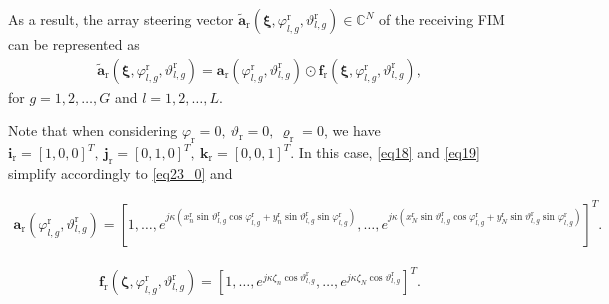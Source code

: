 \documentclass[lettersize,journal]{IEEEtran}
\begin{document}
As a result, the array steering vector $\tilde{\mathbf{a}}_{\textrm{r}}\left ( \boldsymbol{\xi}, \varphi_{l,g}^{\textrm{r}}, \vartheta_{l,g}^{\textrm{r}} \right )\in \mathbb{C}^{N}$ of the receiving FIM can be represented as
\begin{align}\label{eq20}
\tilde{\mathbf{a}}_{\textrm{r}}\left ( \boldsymbol{\xi}, \varphi_{l,g}^{\textrm{r}}, \vartheta_{l,g}^{\textrm{r}} \right )=\mathbf{a}_{\textrm{r}}\left ( \varphi_{l,g}^{\textrm{r}}, \vartheta_{l,g}^{\textrm{r}} \right )\odot\mathbf{f}_{\textrm{r}}\left ( \boldsymbol{\xi}, \varphi_{l,g}^{\textrm{r}}, \vartheta_{l,g}^{\textrm{r}} \right ),
\end{align}
for $g=1,2,\ldots,G$ and $l=1,2,\ldots,L$.

Note that when considering $\varphi _{\textrm{r}}=0,\ \vartheta _{\textrm{r}}=0,\ \varrho _{\textrm{r}}=0$, we have $\mathbf{i}_{\textrm{r}}=\left [ 1,0,0 \right ]^{T},\ \mathbf{j}_{\textrm{r}}=\left [ 0,1,0 \right ]^{T},\ \mathbf{k}_{\textrm{r}}=\left [ 0,0,1 \right ]^{T}$. In this case, \eqref{eq18} and \eqref{eq19} simplify accordingly to \eqref{eq23_0} and
\begin{figure*}[!t]
\begin{align}\label{eq23_0}
 \mathbf{a}_{\textrm{r}}\left ( \varphi_{l,g}^{\textrm{r}}, \vartheta_{l,g}^{\textrm{r}} \right )=\left [ 1,\ldots , e^{j\kappa \left ( x_{n}^{\textrm{r}}\sin\vartheta_{l,g}^{\textrm{r}} \cos\varphi_{l,g}^{\textrm{r}}+y_{n}^{\textrm{r}}\sin\vartheta_{l,g}^{\textrm{r}} \sin\varphi_{l,g}^{\textrm{r}} \right )}, \ldots ,e^{j\kappa \left ( x_{N}^{\textrm{r}}\sin\vartheta_{l,g}^{\textrm{r}} \cos\varphi_{l,g}^{\textrm{r}}+y_{N}^{\textrm{r}}\sin\vartheta_{l,g}^{\textrm{r}} \sin\varphi_{l,g}^{\textrm{r}} \right )} \right ]^{T}.
\end{align}
\end{figure*}
\begin{align}
 \mathbf{f}_{\textrm{r}}\left ( \boldsymbol{\zeta}, \varphi_{l,g}^{\textrm{r}}, \vartheta_{l,g}^{\textrm{r}} \right )=\left [ 1,\ldots , e^{j\kappa \zeta_{n}\cos\vartheta_{l,g}^{\textrm{r}} }, \ldots ,e^{j\kappa \zeta_{N}\cos\vartheta_{l,g}^{\textrm{r}} } \right ]^{T}.
\end{align}
\end{document}
